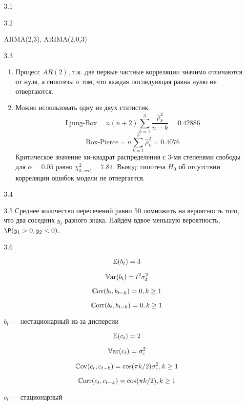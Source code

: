 \protect \hypertarget {soln:3.1}{}
\begin{solution}{{3.1}}

\end{solution}
\protect \hypertarget {soln:3.2}{}
\begin{solution}{{3.2}}

ARMA(2,3), ARIMA(2,0,3)
\end{solution}
\protect \hypertarget {soln:3.3}{}
\begin{solution}{{3.3}}
\begin{enumerate}
\item Процесс $AR(2)$, т.к. две первые частные корреляции значимо отличаются от нуля, а гипотезы о том, что каждая последующая равна нулю не отвергаются.
\item Можно использовать одну из двух статистик
\[
\text{Ljung-Box}=n(n+2)\sum_{k=1}^3\frac{\hat{\rho}_k^2}{n-k}=
0.42886
\]
\[
\text{Box-Pierce}=n\sum_{k=1}^3\hat{\rho}_k^2=
0.4076
\]
Критическое значение хи-квадрат распределения с 3-мя степенями свободы для $\alpha=0.05$ равно $\chi^2_{3,crit}=7.81$.
Вывод: гипотеза $H_0$ об отсутствии корреляции ошибок модели не отвергается.
\end{enumerate}
\end{solution}
\protect \hypertarget {soln:3.4}{}
\begin{solution}{{3.4}}

\end{solution}
\protect \hypertarget {soln:3.5}{}
\begin{solution}{{3.5}}
Среднее количество пересечений равно 50 помножить на вероятность того, что два соседних $y_t$ разного знака. Найдём вдвое меньшую вероятность, $\P(y_1>0, y_2 <0)$.
\end{solution}
\protect \hypertarget {soln:3.6}{}
\begin{solution}{{3.6}}

\[
\operatorname{\mathbb{E}}(b_t) = 3
\]

\[
\operatorname{\mathbb{V}\mathrm{ar}}(b_t) = t^2 \sigma^2_{\varepsilon}
\]

\[
\operatorname{\mathbb{C}\mathrm{ov}}(b_t, b_{t-k}) = 0, k \geq 1
\]

\[
\operatorname{\mathbb{C}\mathrm{orr}}(b_t, b_{t-k}) = 0, k \geq 1
\]

$b_t$ — нестационарный из-за дисперсии


\[
\operatorname{\mathbb{E}}(c_t) = 2
\]

\[
\operatorname{\mathbb{V}\mathrm{ar}}(c_t) = \sigma^2_{\varepsilon}
\]

\[
\operatorname{\mathbb{C}\mathrm{ov}}(c_t, c_{t-k}) = \cos( \pi k /2)\sigma^2_{\varepsilon}, k \geq 1
\]

\[
\operatorname{\mathbb{C}\mathrm{orr}}(c_t, c_{t-k}) = \cos( \pi k /2), k \geq 1
\]

$c_t$ — стационарный
\end{solution}
